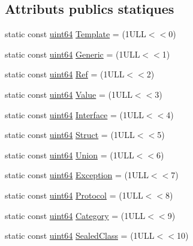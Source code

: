 \subsection*{Attributs publics statiques}
\begin{DoxyCompactItemize}
\item 
static const \hyperlink{qglobal_8h_a29940ae63ec06c9998bba873e25407ad}{uint64} \hyperlink{class_entry_ae239a5ac21792686fed8a38e2dd49161}{Template} = (1\+U\+L\+L$<$$<$0)
\item 
static const \hyperlink{qglobal_8h_a29940ae63ec06c9998bba873e25407ad}{uint64} \hyperlink{class_entry_ae02e62d1c60a9a43bed5d691b5a048b8}{Generic} = (1\+U\+L\+L$<$$<$1)
\item 
static const \hyperlink{qglobal_8h_a29940ae63ec06c9998bba873e25407ad}{uint64} \hyperlink{class_entry_a530abd3056891add4d91ef6b26a55ca1}{Ref} = (1\+U\+L\+L$<$$<$2)
\item 
static const \hyperlink{qglobal_8h_a29940ae63ec06c9998bba873e25407ad}{uint64} \hyperlink{class_entry_aed8b4b067480b3b467f64363e390be17}{Value} = (1\+U\+L\+L$<$$<$3)
\item 
static const \hyperlink{qglobal_8h_a29940ae63ec06c9998bba873e25407ad}{uint64} \hyperlink{class_entry_ab880f63d6603f9ba28fcea37575ff7ce}{Interface} = (1\+U\+L\+L$<$$<$4)
\item 
static const \hyperlink{qglobal_8h_a29940ae63ec06c9998bba873e25407ad}{uint64} \hyperlink{class_entry_a62352fd788f44f3b34541092e3bee1a2}{Struct} = (1\+U\+L\+L$<$$<$5)
\item 
static const \hyperlink{qglobal_8h_a29940ae63ec06c9998bba873e25407ad}{uint64} \hyperlink{class_entry_a2954b31782155586b4d154cd8bcbaa86}{Union} = (1\+U\+L\+L$<$$<$6)
\item 
static const \hyperlink{qglobal_8h_a29940ae63ec06c9998bba873e25407ad}{uint64} \hyperlink{class_entry_af0d4d4eb70d52c24edeacf0fd339279e}{Exception} = (1\+U\+L\+L$<$$<$7)
\item 
static const \hyperlink{qglobal_8h_a29940ae63ec06c9998bba873e25407ad}{uint64} \hyperlink{class_entry_a3a84b60a59e7bc7cb2d1b71e3be16d80}{Protocol} = (1\+U\+L\+L$<$$<$8)
\item 
static const \hyperlink{qglobal_8h_a29940ae63ec06c9998bba873e25407ad}{uint64} \hyperlink{class_entry_aa6c8050991d37fb7c7f56f50399c75c2}{Category} = (1\+U\+L\+L$<$$<$9)
\item 
static const \hyperlink{qglobal_8h_a29940ae63ec06c9998bba873e25407ad}{uint64} \hyperlink{class_entry_a52ebcc0cc1ada1d65110f17c5a53bae8}{Sealed\+Class} = (1\+U\+L\+L$<$$<$10)
$$
\end{DoxyCompactItemize}
